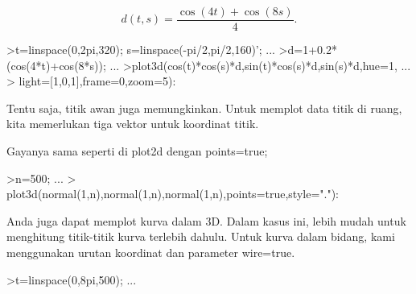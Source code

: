 \documentclass[a4paper,10pt]{article}
\begin{document}
\begin{eulernotebook}
\begin{eulercomment}
\begin{eulercomment}
\begin{eulercomment}
\begin{eulercomment}
\begin{eulercomment}
\begin{eulercomment}
\begin{eulercomment}
\begin{eulercomment}
\begin{eulercomment}
\begin{eulercomment}
\begin{eulercomment}
\begin{eulercomment}
\begin{eulercomment}
\begin{eulercomment}
\begin{eulercomment}
\begin{eulercomment}
\begin{eulercomment}
\begin{eulercomment}
\begin{eulercomment}
\begin{eulercomment}
\begin{eulercomment}
\begin{eulercomment}
\begin{eulercomment}
\begin{eulercomment}
\begin{eulercomment}
\begin{eulercomment}
\begin{eulercomment}
\begin{eulercomment}
\begin{eulercomment}
\begin{eulercomment}
\begin{eulercomment}
\begin{eulercomment}
\begin{eulercomment}
\begin{eulercomment}
\begin{eulercomment}
\begin{eulercomment}
\begin{eulercomment}
\begin{eulercomment}
\begin{eulercomment}
\begin{eulercomment}
\begin{eulercomment}
\end{eulercomment}
\begin{eulerformula}
\[
d(t,s) = \frac{\cos(4t)+\cos(8s)}{4}.
\]
\end{eulerformula}
\begin{eulerprompt}
>t=linspace(0,2pi,320); s=linspace(-pi/2,pi/2,160)'; ...
>d=1+0.2*(cos(4*t)+cos(8*s)); ...
>plot3d(cos(t)*cos(s)*d,sin(t)*cos(s)*d,sin(s)*d,hue=1, ...
>  light=[1,0,1],frame=0,zoom=5):
\end{eulerprompt}
\begin{eulercomment}
Tentu saja, titik awan juga memungkinkan. Untuk memplot data titik di
ruang, kita memerlukan tiga vektor untuk koordinat titik.

Gayanya sama seperti di plot2d dengan points=true;
\end{eulercomment}
\begin{eulerprompt}
>n=500;  ...
>  plot3d(normal(1,n),normal(1,n),normal(1,n),points=true,style="."):
\end{eulerprompt}
\begin{eulercomment}
Anda juga dapat memplot kurva dalam 3D. Dalam kasus ini, lebih mudah
untuk menghitung titik-titik kurva terlebih dahulu. Untuk kurva dalam
bidang, kami menggunakan urutan koordinat dan parameter wire=true.
\end{eulercomment}
\begin{eulerprompt}
>t=linspace(0,8pi,500); ...

\end{eulerprompt}
\end{eulercomment}
\end{eulercomment}
\end{eulercomment}
\end{eulercomment}
\end{eulercomment}
\end{eulercomment}
\end{eulercomment}
\end{eulercomment}
\end{eulercomment}
\end{eulercomment}
\end{eulercomment}
\end{eulercomment}
\end{eulercomment}
\end{eulercomment}
\end{eulercomment}
\end{eulercomment}
\end{eulercomment}
\end{eulercomment}
\end{eulercomment}
\end{eulercomment}
\end{eulercomment}
\end{eulercomment}
\end{eulercomment}
\end{eulercomment}
\end{eulercomment}
\end{eulercomment}
\end{eulercomment}
\end{eulercomment}
\end{eulercomment}
\end{eulercomment}
\end{eulercomment}
\end{eulercomment}
\end{eulercomment}
\end{eulercomment}
\end{eulercomment}
\end{eulercomment}
\end{eulercomment}
\end{eulercomment}
\end{eulercomment}
\end{eulercomment}
\end{eulernotebook}
\end{document}
